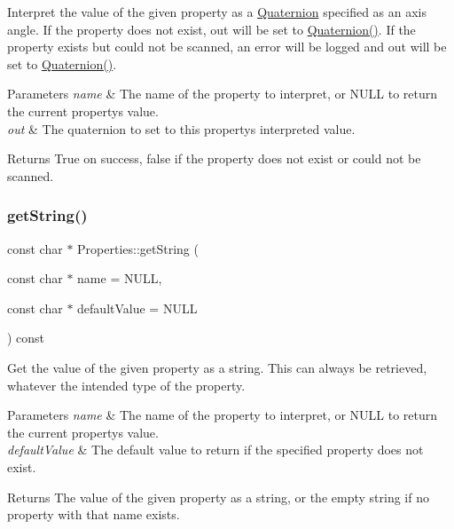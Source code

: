 Interpret the value of the given property as a \hyperlink{classQuaternion}{Quaternion} specified as an axis angle. If the property does not exist, out will be set to \hyperlink{classQuaternion}{Quaternion()}. If the property exists but could not be scanned, an error will be logged and out will be set to \hyperlink{classQuaternion}{Quaternion()}.


\begin{DoxyParams}{Parameters}
{\em name} & The name of the property to interpret, or N\+U\+LL to return the current property\textquotesingle{}s value. \\
\hline
{\em out} & The quaternion to set to this property\textquotesingle{}s interpreted value.\\
\hline
\end{DoxyParams}
\begin{DoxyReturn}{Returns}
True on success, false if the property does not exist or could not be scanned. 
\end{DoxyReturn}
\mbox{\label{classProperties_adaf74082354288405dba508c7d0fe342}} 
\subsubsection{\texorpdfstring{get\+String()}{getString()}\hspace{0.1cm}{\footnotesize\ttfamily [1/2]}}
{\footnotesize\ttfamily const char $\ast$ Properties\+::get\+String (\begin{DoxyParamCaption}\item[{const char $\ast$}]{name = {\ttfamily NULL},  }\item[{const char $\ast$}]{default\+Value = {\ttfamily NULL} }\end{DoxyParamCaption}) const}

Get the value of the given property as a string. This can always be retrieved, whatever the intended type of the property.


\begin{DoxyParams}{Parameters}
{\em name} & The name of the property to interpret, or N\+U\+LL to return the current property\textquotesingle{}s value. \\
\hline
{\em default\+Value} & The default value to return if the specified property does not exist.\\
\hline
\end{DoxyParams}
\begin{DoxyReturn}{Returns}
The value of the given property as a string, or the empty string if no property with that name exists. 
\end{DoxyReturn}
\mbox{\label{classProperties_a33e7fe8393290a0165a7ddb77ead10ea}} 
